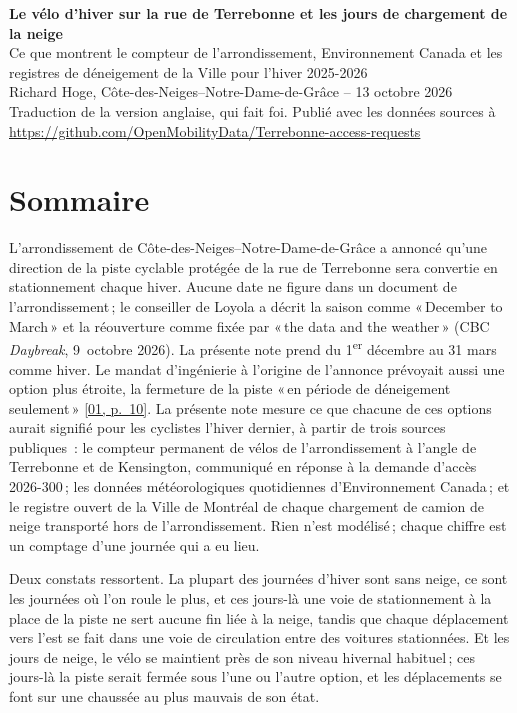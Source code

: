\documentclass[11pt,letterpaper]{article}
\newcommand{\repourl}{https://github.com/OpenMobilityData/Terrebonne-access-requests}
\newcommand{\repo}[1]{\href{\repourl}{#1}}
\newcommand{\pagesurl}{https://openmobilitydata.github.io/Terrebonne-access-requests}
\newcommand{\pgl}[3]{\href{\pagesurl/\csname bundle#1\endcsname\#page=#2}{\textsf{\small[#1, p.~#3]}}}
\newcommand{\pg}[2]{\pgl{#1}{#2}{#2}}
\begin{document}
\begin{center}
{\Large\bfseries Le vélo d'hiver sur la rue de Terrebonne et les jours de chargement de la neige}\\[0.4em]
{\large Ce que montrent le compteur de l'arrondissement, Environnement Canada et les registres de déneigement de la Ville pour l'hiver 2025-2026}\\[0.6em]
Richard Hoge, Côte-des-Neiges--Notre-Dame-de-Grâce -- 13 octobre 2026\\
Traduction de la version anglaise, qui fait foi. Publié avec les données sources à \repo{\repourl}
\end{center}

\section*{Sommaire}

L'arrondissement de Côte-des-Neiges--Notre-Dame-de-Grâce a annoncé qu'une
direction de la piste cyclable protégée de la rue de Terrebonne sera
convertie en stationnement chaque hiver. Aucune date ne figure dans un
document de l'arrondissement\,; le conseiller de Loyola a décrit la saison
comme «\,December to March\,» et la réouverture comme fixée par «\,the data
and the weather\,» (CBC \emph{Daybreak}, 9~octobre 2026). La présente note
prend du 1\textsuperscript{er} décembre au 31 mars comme hiver. Le mandat
d'ingénierie à l'origine de l'annonce prévoyait
aussi une option plus étroite, la fermeture de la piste «\,en période de
déneigement seulement\,» \pg{01}{10}. La présente note mesure ce que
chacune de ces options aurait signifié pour les cyclistes l'hiver dernier,
à partir de trois sources publiques~: le compteur permanent de vélos de
l'arrondissement à l'angle de Terrebonne et de Kensington, communiqué en
réponse à la demande d'accès 2026-300\,; les données météorologiques
quotidiennes d'Environnement Canada\,; et le registre ouvert de la Ville de
Montréal de chaque chargement de camion de neige transporté hors de
l'arrondissement. Rien n'est modélisé\,; chaque chiffre est un comptage
d'une journée qui a eu lieu.

Deux constats ressortent. La plupart des journées d'hiver sont sans neige,
ce sont les journées où l'on roule le plus, et ces jours-là une voie de
stationnement à la place de la piste ne sert aucune fin liée à la neige,
tandis que chaque déplacement vers l'est se fait dans une voie de
circulation entre des voitures stationnées. Et les jours de neige, le vélo
se maintient près de son niveau hivernal habituel\,; ces jours-là la piste
serait fermée sous l'une ou l'autre option, et les déplacements se font
sur une chaussée au plus mauvais de son état.
\end{document}
